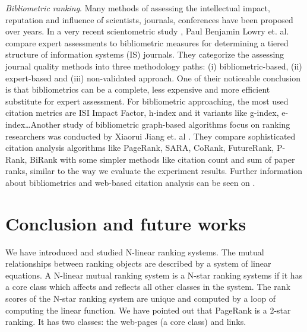 \documentclass[10pt,leqno,twoside]{article}
\begin{document}
\textit{Bibliometric ranking}.
Many methods of assessing the intellectual impact, reputation and influence of scientists, journals, conferences have been proposed over years. In a very recent scientometric study \cite{EvaluatingJournal}, Paul Benjamin Lowry et. al. compare expert assessments to bibliometric measures for determining a tiered structure of information systems (IS) journals. They categorize the assessing journal quality methods into three methodology paths: (i) bibliometric-based, (ii) expert-based and  (iii) non-validated approach.
One of their noticeable conclusion is that bibliometrics can be a complete, less expensive and more efficient substitute for expert assessment. For bibliometric approaching, the most used citation metrics are ISI Impact Factor, h-index and it variants like g-index, e-index\ldots Another study of bibliometric graph-based algorithms focus on ranking researchers was conducted by Xiaorui Jiang et. al \cite{Graphbased}. They compare sophisticated citation analysis algorithms like PageRank, SARA, CoRank, FutureRank, P-Rank, BiRank with some simpler methods like citation count and sum of paper ranks, similar to the way we evaluate the experiment results. Further information about bibliometrics and web-based citation analysis can be seen on \cite{Cronin-JIS-01}.

\section{Conclusion and future works}\label{Sect:Conclusion}
We have introduced and studied N-linear ranking systems. The mutual relationships between ranking objects are described by a system of linear equations. A N-linear mutual ranking system is a N-star ranking systems if it has a core class which affects and reflects all other classes in the system. The rank scores of the N-star ranking system are unique and computed by a loop of computing the linear function. We have pointed out that PageRank is a 2-star ranking. It has two classes:  the web-pages (a core class) and links.
\end{document}
